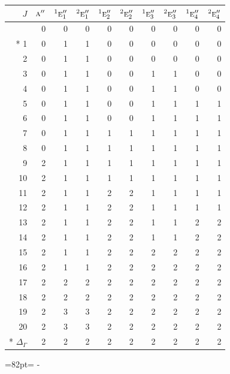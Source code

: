 \documentclass[10pt,a4paper]{article}
\makeatletter
\def\grouprule#1#2{\noalign{\marks\LTgroupmarks{\the\belowrulesep}\nobreak\vskip#1%
  \vskip\aboverulesep}\multispan\LT@cols\unskip{\leaders\hrule\@height#2\hfill\kern\z@}\cr
  \noalign{\penalty\LTrulebreak\vskip\belowrulesep\global\@lastruleclass\z@}}
\newcommand{\needspace}[1]{\par\penalty-100\begingroup\dimen0=#1\relax\dimen2=\pagegoal
  \advance\dimen2-\pagetotal\ifdim\dimen0>\dimen2\relax\ifdim\dimen2>0pt\vfil\break\fi\fi
  \endgroup}
\numberwithin{equation}{section}
\newcommand{\irr}[1]{\text{\normalfont\scshape #1}}
\newcommand{\conjpair}[1]{{}^{#1}}
\makeatother
\begin{document}
{\small\begin{longtable}{@{}rrrrrrrrrr@{}}\toprule
$J$ & $\irr{a}''$ & $\conjpair{1}\irr{e}_{1}''$ & $\conjpair{2}\irr{e}_{1}''$ & $\conjpair{1}\irr{e}_{2}''$ & $\conjpair{2}\irr{e}_{2}''$ & $\conjpair{1}\irr{e}_{3}''$ & $\conjpair{2}\irr{e}_{3}''$ & $\conjpair{1}\irr{e}_{4}''$ & $\conjpair{2}\irr{e}_{4}''$\\\midrule\endhead
\bottomrule\endfoot\endlastfoot
0 & 0 & 0 & 0 & 0 & 0 & 0 & 0 & 0 & 0\\*
1 & 0 & 1 & 1 & 0 & 0 & 0 & 0 & 0 & 0\\
2 & 0 & 1 & 1 & 0 & 0 & 0 & 0 & 0 & 0\\
3 & 0 & 1 & 1 & 0 & 0 & 1 & 1 & 0 & 0\\
4 & 0 & 1 & 1 & 0 & 0 & 1 & 1 & 0 & 0\\
5 & 0 & 1 & 1 & 0 & 0 & 1 & 1 & 1 & 1\\
6 & 0 & 1 & 1 & 0 & 0 & 1 & 1 & 1 & 1\\
7 & 0 & 1 & 1 & 1 & 1 & 1 & 1 & 1 & 1\\
8 & 0 & 1 & 1 & 1 & 1 & 1 & 1 & 1 & 1\\
9 & 2 & 1 & 1 & 1 & 1 & 1 & 1 & 1 & 1\\
10 & 2 & 1 & 1 & 1 & 1 & 1 & 1 & 1 & 1\\
11 & 2 & 1 & 1 & 2 & 2 & 1 & 1 & 1 & 1\\
12 & 2 & 1 & 1 & 2 & 2 & 1 & 1 & 1 & 1\\
13 & 2 & 1 & 1 & 2 & 2 & 1 & 1 & 2 & 2\\
14 & 2 & 1 & 1 & 2 & 2 & 1 & 1 & 2 & 2\\
15 & 2 & 1 & 1 & 2 & 2 & 2 & 2 & 2 & 2\\
16 & 2 & 1 & 1 & 2 & 2 & 2 & 2 & 2 & 2\\
17 & 2 & 2 & 2 & 2 & 2 & 2 & 2 & 2 & 2\\
18 & 2 & 2 & 2 & 2 & 2 & 2 & 2 & 2 & 2\\
19 & 2 & 3 & 3 & 2 & 2 & 2 & 2 & 2 & 2\\
20 & 2 & 3 & 3 & 2 & 2 & 2 & 2 & 2 & 2\\*
\grouprule{0pt}{\lightrulewidth} $\Delta_\Gamma$ & 2 & 2 & 2 & 2 & 2 & 2 & 2 & 2 & 2\\
\bottomrule\end{longtable}}
\needspace{82pt}
\end{document}
